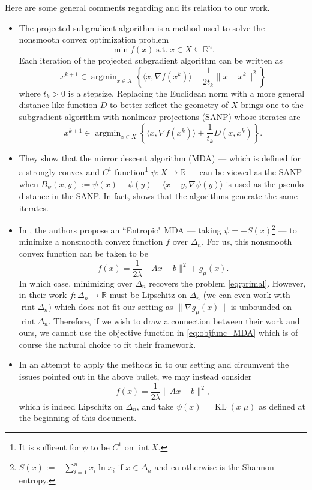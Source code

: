 \documentclass[10pt,a4paper]{article}
\numberwithin{equation}{section}
\theoremstyle{definition}
\def\rr{{\mathbb R}}
\DeclareMathOperator{\rint}{rint}
\DeclareMathOperator{\interior}{int}
\DeclareMathOperator{\argmin}{argmin}
\DeclareMathOperator{\KL}{KL}
\begin{document}
Here are some general comments regarding \cite{Beck2003MirrorDA} and its relation to our work.

\begin{itemize}
    \item The projected subgradient algorithm is a method used to solve the nonsmooth convex optimization problem 
    \[
    \min f(x) \; \text{s.t.} \; x \in X \subseteq \rr^n.
    \]
    Each iteration of the projected subgradient algorithm can be written as
    \[
    x^{k+1} \in \argmin_{x \in X} \left\{ \langle x, \nabla f(x^k) \rangle + \frac{1}{2 t_k}\lVert x - x^k \rVert^2 \right\}
    \]
    where $t_k>0$ is a stepsize. Replacing the Euclidean norm with a more general distance-like function $D$ to better reflect the geometry of $X$ brings one to the subgradient algorithm with nonlinear projections (SANP) whose iterates are
     \[
    x^{k+1} \in \argmin_{x \in X} \left\{ \langle x, \nabla f(x^k) \rangle + \frac{1}{t_k}D(x, x^k) \right\}.
    \]
    
    \item They show that the mirror descent algorithm (MDA) --- which is defined for a strongly convex and $C^1$ function\footnote{It is sufficent for $\psi$ to be $C^1$ on $\interior X$.} $\psi: X \to \rr$ --- can be viewed as the SANP when $B_\psi(x,y) := \psi(x) - \psi(y) - \langle x-y, \nabla \psi(y) \rangle$ is used as the pseudo-distance in the SANP. In fact, \cite[Proposition 3.2]{Beck2003MirrorDA} shows that the algorithms generate the same iterates.
    
    \item In \cite[\S{5}]{Beck2003MirrorDA}, the authors propose an ``Entropic" MDA --- taking $\psi = -S(x)$\footnote{$S(x):= - \sum_{i=1}^n x_i \ln x_i$ if $x \in \Delta_n$ and $\infty$ otherwise is the Shannon entropy.} --- to minimize a nonsmooth convex function $f$ over $\Delta_n$. For us, this nonsmooth convex function can be taken to be 
    \begin{equation}\label{eq:objfunc_MDA}
    f(x) = \frac{1}{2 \lambda} \lVert Ax - b \rVert^2 + g_\mu(x).
    \end{equation}
    In which case, minimizing over $\Delta_n$ recovers the problem \eqref{eq:primal}. However, in their work $f: \Delta_n \to \rr$ must be Lipschitz on $\Delta_n$ (we can even work with $\rint \Delta_n)$ which does not fit our setting as $\lVert \nabla g_\mu(x) \rVert$ is unbounded on $\rint \Delta_n$. Therefore, if we wish to draw a connection between their work and ours, we cannot use the objective function in \eqref{eq:objfunc_MDA} which is of course the natural choice to fit their framework.

    \item In an attempt to apply the methods in \cite{Beck2003MirrorDA} to our setting and circumvent the issues pointed out in the above bullet, we may instead consider
    \begin{equation}\label{eq:objfunc_MDA_2}
    f(x) = \frac{1}{2 \lambda} \lVert Ax - b \rVert^2,
    \end{equation}
    which is indeed Lipschitz on $\Delta_n$, and take $\psi(x) = \KL(x|\mu)$ as defined at the beginning of this document.
\end{itemize}
\end{document}
